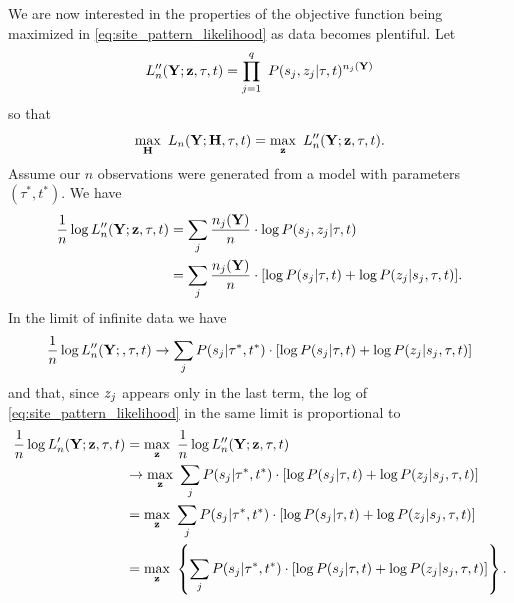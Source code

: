 \documentclass[a4paper]{article}
\begin{document}
We are now interested in the properties of the objective function being maximized in \eqref{eq:site_pattern_likelihood} as data becomes plentiful.
Let
$$
L_n''(\mathbf{Y};\mathbf{z},\tau,t) = \prod_{j=1}^q \ P(s_j, z_j | \tau, t)^{n_j(\mathbf{Y})}
$$
so that
$$
\max_{\fullAncestralStates} \ L_n(\fullAlignment;\fullAncestralStates, \tau, t) =
    \max_{\fullAncestralStateCategories} \ L_n''(\fullAlignment;\fullAncestralStateCategories,\tau,t).
$$
Assume our $n$ observations were generated from a model with parameters $(\tau^*, t^*)$.
We have
\begin{align}
    \frac{1}{n} \log L_n''(\mathbf{Y};\mathbf{z},\tau,t)
        &= \sum_{j} \frac{n_j(\mathbf{Y})}{n}\cdot  \log P(s_j, z_j | \tau, t) \\
        &= \sum_{j} \frac{n_j(\mathbf{Y})}{n}\cdot [\log P(s_j | \tau, t) + \log P(z_j | s_j, \tau, t)].
\end{align}
In the limit of infinite data we have
$$
\frac{1}{n} \log L_n''(\mathbf{Y};,\tau,t) \rightarrow \sum_{j} P(s_j | \tau^*, t^*) \cdot [\log P(s_j | \tau, t) + \log P(z_j | s_j, \tau, t)]
$$
and that, since $z_j$ appears only in the last term, the log of \eqref{eq:site_pattern_likelihood} in the same limit is proportional to
\begin{align}
\frac{1}{n} \log L_n'(\mathbf{Y};\mathbf{z},\tau, t)
    &= \max_{\mathbf{z}} \ \frac{1}{n} \log L_n''(\mathbf{Y};\mathbf{z},\tau,t) \nonumber \\
    &\rightarrow \max_{\mathbf{z}} \ \sum_{j} P(s_j | \tau^*, t^*) \cdot [\log P(s_j | \tau, t) + \log P(z_j | s_j, \tau, t)] \nonumber \\
    &= \max_{\mathbf{z}} \ \sum_{j} P(s_j | \tau^*, t^*) \cdot [\log P(s_j | \tau, t) + \log P(z_j | s_j, \tau, t)] \nonumber \\
    &= \max_{\mathbf{z}} \ \left\{\sum_{j} P(s_j | \tau^*, t^*) \cdot \left[\log P(s_j | \tau, t) + \log P(z_j | s_j, \tau, t)\right]\right\}. \label{eq:site_pattern_profile_likelihood_mean}
\end{align}
\end{document}
